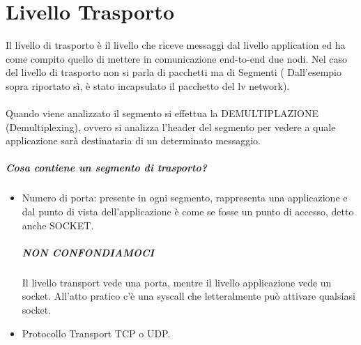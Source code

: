 \documentclass[12pt, a4paper, openany, twoside]{book}
\begin{document}
\chapter{Livello Trasporto}
Il livello di trasporto è il livello che riceve messaggi dal livello application
ed ha come compito quello di mettere in comunicazione end-to-end due nodi.
Nel caso del livello di trasporto non si parla di pacchetti ma di Segmenti (
Dall'esempio sopra riportato sì, è stato incapsulato il pacchetto del lv network).
\\ \\
Quando viene analizzato il segmento si effettua la DEMULTIPLAZIONE 
(Demultiplexing), ovvero si analizza l'header del segmento per vedere a quale
applicazione sarà destinataria di un determinato messaggio.
\paragraph{Cosa contiene un segmento di trasporto?}
\begin{itemize}
	\item Numero di porta: presente in ogni segmento, rappresenta una applicazione
	e dal punto di vista dell'applicazione è come se fosse un punto di 
	accesso, detto anche SOCKET. 
	\paragraph{NON CONFONDIAMOCI} Il livello transport vede una porta, mentre
	il livello applicazione vede un socket. All'atto pratico c'è una syscall
	che letteralmente può attivare qualsiasi socket.
	\item Protocollo Transport TCP o UDP.
\end{itemize}
\end{document}
